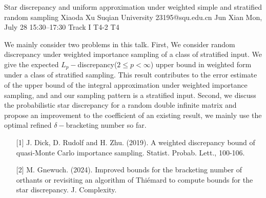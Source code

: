 \begin{talk}
  {Star discrepancy and uniform approximation under weighted simple and stratified random sampling}%
  {Xiaoda Xu}%
  {Suqian University}%
  {23195@squ.edu.cn}%
  {Jun Xian}%
  {}%
  {Mon, July 28 15:30–17:30 Track I}%
  {T4-2}%
  {T4}%
  
				
			
We mainly consider two problems in this talk. First, We consider random discrepancy under weighted importance sampling of a class of stratified input. We give the expected $L_p-$discrepancy($2\leq p<\infty$) upper bound in weighted form under a class of stratified sampling. This result contributes to the error estimate of the upper bound of the integral approximation under weighted importance sampling, and and our sampling pattern is a stratified input. Second, we discuss the probabilistic star discrepancy for a random double infinite matrix and propose an improvement to the coefficient of an existing result, we mainly use the optimal refined $\delta-$bracketing number so far.
\medskip


\begin{enumerate}
	\item[{[1]}] J. Dick, D. Rudolf and H. Zhu. (2019). A weighted discrepancy bound of quasi-Monte Carlo importance sampling. Statist. Probab. Lett., 100-106.
	\item[{[2]}] M. Gnewuch. (2024). Improved bounds for the bracketing number of orthants or revisiting an algorithm of Thiémard to compute bounds for the star discrepancy. J. Complexity.
\end{enumerate}


\end{talk}

